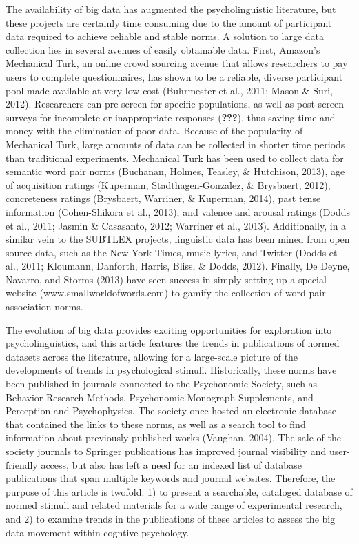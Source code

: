 \documentclass[english,man]{apa6}
\theoremstyle{definition}
\theoremstyle{definition}
\theoremstyle{definition}
\theoremstyle{remark}
\begin{document}
The availability of big data has augmented the psycholinguistic
literature, but these projects are certainly time consuming due to the
amount of participant data required to achieve reliable and stable
norms. A solution to large data collection lies in several avenues of
easily obtainable data. First, Amazon's Mechanical Turk, an online crowd
sourcing avenue that allows researchers to pay users to complete
questionnaires, has shown to be a reliable, diverse participant pool
made available at very low cost (Buhrmester et al., 2011; Mason \& Suri,
2012). Researchers can pre-screen for specific populations, as well as
post-screen surveys for incomplete or inappropriate responses
({\textbf{???}}), thus saving time and money with the elimination of
poor data. Because of the popularity of Mechanical Turk, large amounts
of data can be collected in shorter time periods than traditional
experiments. Mechanical Turk has been used to collect data for semantic
word pair norms (Buchanan, Holmes, Teasley, \& Hutchison, 2013), age of
acquisition ratings (Kuperman, Stadthagen-Gonzalez, \& Brysbaert, 2012),
concreteness ratings (Brysbaert, Warriner, \& Kuperman, 2014), past
tense information (Cohen-Shikora et al., 2013), and valence and arousal
ratings (Dodds et al., 2011; Jasmin \& Casasanto, 2012; Warriner et al.,
2013). Additionally, in a similar vein to the SUBTLEX projects,
linguistic data has been mined from open source data, such as the New
York Times, music lyrics, and Twitter (Dodds et al., 2011; Kloumann,
Danforth, Harris, Bliss, \& Dodds, 2012). Finally, De Deyne, Navarro,
and Storms (2013) have seen success in simply setting up a special
website (www.smallworldofwords.com) to gamify the collection of word
pair association norms.

The evolution of big data provides exciting opportunities for
exploration into psycholinguistics, and this article features the trends
in publications of normed datasets across the literature, allowing for a
large-scale picture of the developments of trends in psychological
stimuli. Historically, these norms have been published in journals
connected to the Psychonomic Society, such as Behavior Research Methods,
Psychonomic Monograph Supplements, and Perception and Psychophysics. The
society once hosted an electronic database that contained the links to
these norms, as well as a search tool to find information about
previously published works (Vaughan, 2004). The sale of the society
journals to Springer publications has improved journal visibility and
user-friendly access, but also has left a need for an indexed list of
database publications that span multiple keywords and journal websites.
Therefore, the purpose of this article is twofold: 1) to present a
searchable, cataloged database of normed stimuli and related materials
for a wide range of experimental research, and 2) to examine trends in
the publications of these articles to assess the big data movement
within cogntive psychology.
\end{document}
